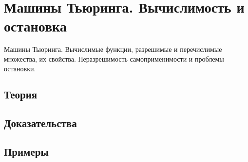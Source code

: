 
\section{Машины Тьюринга. Вычислимость и остановка}
\label{sec:2.3a.05-turing-machines}

\begin{ticket}
Машины Тьюринга. Вычислимые функции, разрешимые и перечислимые множества, их свойства. Неразрешимость самоприменимости и проблемы остановки.
\end{ticket}

\subsection*{Теория}

\subsection*{Доказательства}

\subsection*{Примеры}
